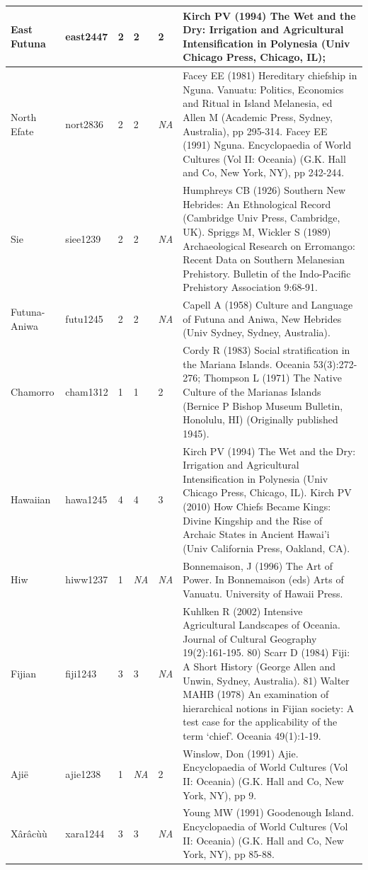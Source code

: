 \documentclass[a4paper,10pt]{article} %
\begin{document}
\begin{landscape}
\begin{longtable}{ | p{2cm}| p{2cm}| p{1.8cm}| p{1.8cm}| p{3cm}| p{9cm}| }
East Futuna&east2447&2&2&2&Kirch PV (1994) The Wet and the Dry: Irrigation and Agricultural Intensification in Polynesia (Univ Chicago Press, Chicago, IL);\\ \hline
North Efate&nort2836&2&2&\emph{NA}&Facey EE (1981) Hereditary chiefship in Nguna. Vanuatu: Politics, Economics and Ritual in Island Melanesia, ed Allen M (Academic Press, Sydney, Australia), pp 295-314. Facey EE (1991) Nguna. Encyclopaedia of World Cultures (Vol II: Oceania) (G.K. Hall and Co, New York, NY), pp 242-244. \\ \hline
Sie&siee1239&2&2&\emph{NA}&Humphreys CB (1926) Southern New Hebrides: An Ethnological Record (Cambridge Univ Press, Cambridge, UK). Spriggs M, Wickler S (1989) Archaeological Research on Erromango: Recent Data on Southern Melanesian Prehistory. Bulletin of the Indo-Pacific Prehistory Association 9:68-91.\\ \hline
Futuna-Aniwa&futu1245&2&2&\emph{NA}&Capell A (1958) Culture and Language of Futuna and Aniwa, New Hebrides (Univ Sydney, Sydney, Australia).\\ \hline
Chamorro&cham1312&1&1&2&Cordy R (1983) Social stratification in the Mariana Islands. Oceania 53(3):272-276; Thompson L (1971) The Native Culture of the Marianas Islands (Bernice P Bishop Museum Bulletin, Honolulu, HI) (Originally published 1945). \\ \hline
Hawaiian&hawa1245&4&4&3&Kirch PV (1994) The Wet and the Dry: Irrigation and Agricultural Intensification in Polynesia (Univ Chicago Press, Chicago, IL). Kirch PV (2010) How Chiefs Became Kings: Divine Kingship and the Rise of Archaic States in Ancient Hawai'i (Univ California Press, Oakland, CA).\\ \hline
Hiw&hiww1237&1&\emph{NA}&\emph{NA}&Bonnemaison, J (1996) The Art of Power. In Bonnemaison (eds) Arts of Vanuatu. University of Hawaii Press.\\ \hline
Fijian&fiji1243&3&3&\emph{NA}&Kuhlken R (2002) Intensive Agricultural Landscapes of Oceania. Journal of Cultural Geography 19(2):161-195. 80) Scarr D (1984) Fiji: A Short History (George Allen and Unwin, Sydney, Australia). 81) Walter MAHB (1978) An examination of hierarchical notions in Fijian society: A test case for the applicability of the term ‘chief’. Oceania 49(1):1-19. \\ \hline
Ajië&ajie1238&1&\emph{NA}&2&Winslow, Don (1991) Ajie. Encyclopaedia of World Cultures (Vol II: Oceania) (G.K. Hall and Co, New York, NY), pp 9.\\ \hline
Xârâcùù&xara1244&3&3&\emph{NA}&Young MW (1991) Goodenough Island. Encyclopaedia of World Cultures (Vol II: Oceania) (G.K. Hall and Co, New York, NY), pp 85-88.\\ \hline

\end{longtable}
\end{landscape}
\end{document}
